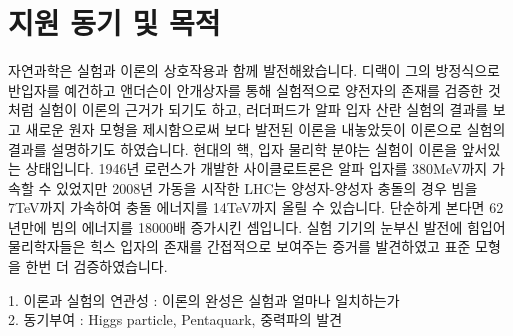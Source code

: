 \documentclass[aps,superscriptaddress,11pt]{revtex4-2}
\begin{document}
\section{지원 동기 및 목적}\noindent
자연과학은 실험과 이론의 상호작용과 함께 발전해왔습니다. 
디랙이 그의 방정식으로 반입자를 예건하고 앤더슨이 안개상자를 통해 실험적으로 양전자의 존재를
검증한 것 처럼 실험이 이론의 근거가 되기도 하고, 러더퍼드가 알파 입자 산란 실험의 결과를 보고
새로운 원자 모형을 제시함으로써 보다 발전된 이론을 내놓았듯이 이론으로 실험의 결과를 설명하기도
하였습니다. 현대의 핵, 입자 물리학 분야는 실험이 이론을 앞서있는 상태입니다.
1946년 로런스가 개발한 사이클로트론은 알파 입자를 380MeV까지 가속할 수 있었지만 2008년 가동을
시작한 LHC는 양성자-양성자 충돌의 경우 빔을 7TeV까지 가속하여 충돌 에너지를 14TeV까지 올릴 수 있습니다.
단순하게 본다면 62년만에 빔의 에너지를 18000배 증가시킨 셈입니다. {\color{red}실험 기기의 눈부신 발전에 힘입어
물리학자들은 힉스 입자의 존재를 간접적으로 보여주는 증거를 발견하였고 표준 모형을 한번 더 검증하였습니다.}

1. 이론과 실험의 연관성 : 이론의 완성은 실험과 얼마나 일치하는가
\\
2. 동기부여 : Higgs particle, Pentaquark, 중력파의 발견
\vfill
\end{document}
